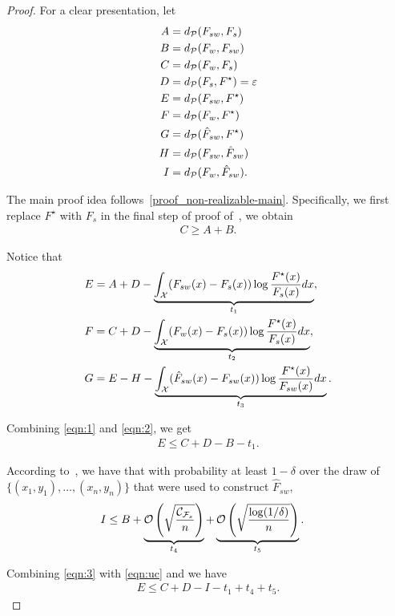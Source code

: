 \begin{proof}

For a clear presentation, let
\begin{align*}
    A &= d_\mathcal{P}(F_{sw}, F_s)\\
    B &=d_\mathcal{P}(F_w, F_{sw}) \\
    C &= d_\mathcal{P}(F_w, F_s)\\
    D &= d_\mathcal{P}(F_s, F^\star) =\varepsilon\\
    E &= d_\mathcal{P}(F_{sw}, F^\star) \\
    F &= d_\mathcal{P}(F_w, F^\star) \\
    G &= d_\mathcal{P}(\hat{F}_{sw}, F^\star) \\
    H &= d_\mathcal{P}(F_{sw}, \hat{F}_{sw}) \\
    I &= d_\mathcal{P}(F_w, \hat{F}_{sw}).
\end{align*}

The main proof idea follows~\cref{proof_non-realizable-main}.
Specifically, we first replace $F^\star$ with $F_s$ in the final step of proof of~, we obtain
\begin{align}
    C \ge A + B. \label{eqn:1}
\end{align}

Notice that
\begin{align}
    & E = A + D - \underbrace{\int_{\mathcal{X}} (F_{sw}(x)-F_s(x))\log \frac{F^\star(x)}{F_s(x)} d x}_{t_1}, \label{eqn:2}\\ 
    & F = C + D - \underbrace{\int_{\mathcal{X}} (F_w(x)-F_s(x))\log \frac{F^\star(x)}{F_s(x)} d x}_{t_2}, \label{eqn:2-1} \\
    & G = E - H - \underbrace{\int_{\mathcal{X}} (\hat{F}_{sw}(x)-F_{sw}(x))\log \frac{F^\star(x)}{F_{sw}(x)} d x}_{t_3} \label{eqn:2-2}. 
\end{align}

Combining \eqref{eqn:1} and \eqref{eqn:2}, we get
\begin{align}
    E \le C + D - B - t_1. \label{eqn:3}
\end{align}


According to~, we have that with probability at least $1-\delta$ over the draw of $\{(x_1,y_1),\dots, (x_n,y_n)\}$ that were used to construct $\hat{F}_{sw}$,
\begin{align}
    I &\le B + \underbrace{\mathcal{O}\left(\sqrt{\frac{\mathcal{C}_{\mathcal{F}_s}}{n}}\right)}_{t_4} + \underbrace{\mathcal{O}\left(\sqrt{\frac{\log(1/\delta)}{n}}\right)}_{t_5}. \label{eqn:uc}
\end{align}

Combining \eqref{eqn:3} with \eqref{eqn:uc} and we have
\begin{align}
    E \le C + D - I - t_1 + t_4 + t_5. \label{eqn:4}
\end{align}


\end{proof}
